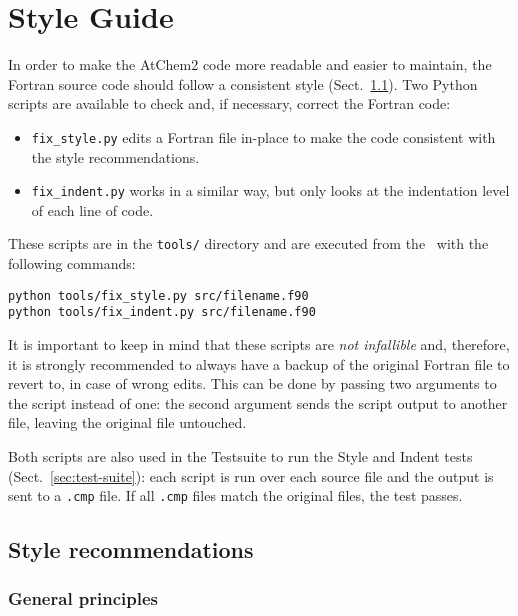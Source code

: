 \section{Style Guide} \label{sec:style-guide}

In order to make the AtChem2 code more readable and easier to
maintain, the Fortran source code should follow a consistent style
(Sect.~\ref{subsec:style-recommendations}). Two Python scripts are
available to check and, if necessary, correct the Fortran code:

\begin{itemize}
\item \texttt{fix\_style.py} edits a Fortran file in-place to make the
  code consistent with the style recommendations.
\item \texttt{fix\_indent.py} works in a similar way, but only looks
  at the indentation level of each line of code.
\end{itemize}

These scripts are in the \texttt{tools/} directory and are executed
from the \maindir\ with the following commands:

\begin{verbatim}
python tools/fix_style.py src/filename.f90
python tools/fix_indent.py src/filename.f90
\end{verbatim}

It is important to keep in mind that these scripts are \emph{not infallible}
and, therefore, it is strongly recommended to always have a backup of the
original Fortran file to revert to, in case of wrong edits. This can be
done by passing two arguments to the script instead of one: the second
argument sends the script output to another file, leaving the original
file untouched.

Both scripts are also used in the Testsuite to run the Style and
Indent tests (Sect.~\ref{sec:test-suite}): each script is run over
each source file and the output is sent to a \texttt{.cmp} file. If
all \texttt{.cmp} files match the original files, the test passes.

\subsection{Style recommendations} \label{subsec:style-recommendations}

\subsubsection{General principles}

